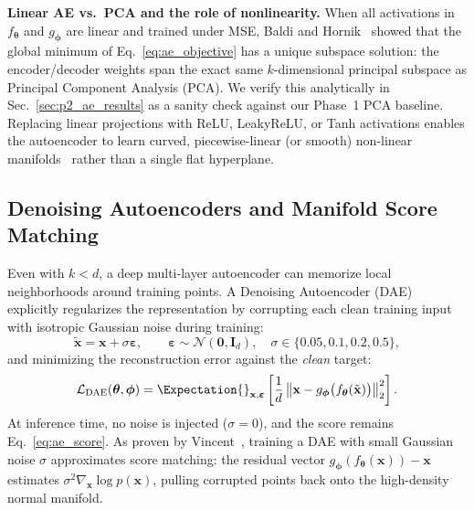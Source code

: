 \textbf{Linear AE vs.\ PCA and the role of nonlinearity.}
When all activations in $f_{\boldsymbol{\theta}}$ and $g_{\boldsymbol{\phi}}$
are linear and trained under MSE, Baldi and Hornik~\cite{baldi1989neural}
showed that the global minimum of Eq.~\eqref{eq:ae_objective} has a unique
subspace solution: the encoder/decoder weights span the exact same $k$-dimensional
principal subspace as Principal Component Analysis (PCA).  We verify this
analytically in Sec.~\ref{sec:p2_ae_results} as a sanity check against our
Phase~1 PCA baseline.  Replacing linear projections with ReLU, LeakyReLU, or
Tanh activations enables the autoencoder to learn curved, piecewise-linear
(or smooth) non-linear manifolds~\cite{hinton2006reducing} rather than a single
flat hyperplane.

\subsection{Denoising Autoencoders and Manifold Score Matching}
\label{sec:dae_theory}

Even with $k < d$, a deep multi-layer autoencoder can memorize local neighborhoods
around training points.  A Denoising Autoencoder (DAE)~\cite{vincent2008extracting}
explicitly regularizes the representation by corrupting each clean training
input with isotropic Gaussian noise during training:
\begin{equation}
    \tilde{\mathbf{x}} = \mathbf{x} + \sigma \boldsymbol{\varepsilon},
    \qquad \boldsymbol{\varepsilon} \sim \mathcal{N}(\mathbf{0}, \mathbf{I}_d),
    \quad \sigma \in \{0.05, 0.1, 0.2, 0.5\},
\end{equation}
and minimizing the reconstruction error against the \emph{clean} target:
\begin{equation}
    \mathcal{L}_{\text{DAE}}(\boldsymbol{\theta}, \boldsymbol{\phi})
    = \Expectation{}_{\mathbf{x}, \boldsymbol{\varepsilon}}
    \left[ \frac{1}{d} \, \bigl\| \mathbf{x} - g_{\boldsymbol{\phi}}\bigl(f_{\boldsymbol{\theta}}(\tilde{\mathbf{x}})\bigr) \bigr\|_2^2 \right].
    \label{eq:dae_loss}
\end{equation}
At inference time, no noise is injected ($\sigma = 0$), and the score remains
Eq.~\eqref{eq:ae_score}.  As proven by Vincent~\cite{vincent2011connection},
training a DAE with small Gaussian noise $\sigma$ approximates score matching:
the residual vector $g_{\boldsymbol{\phi}}(f_{\boldsymbol{\theta}}(\mathbf{x})) - \mathbf{x}$
estimates $\sigma^2 \nabla_{\mathbf{x}} \log p(\mathbf{x})$, pulling corrupted
points back onto the high-density normal manifold.

